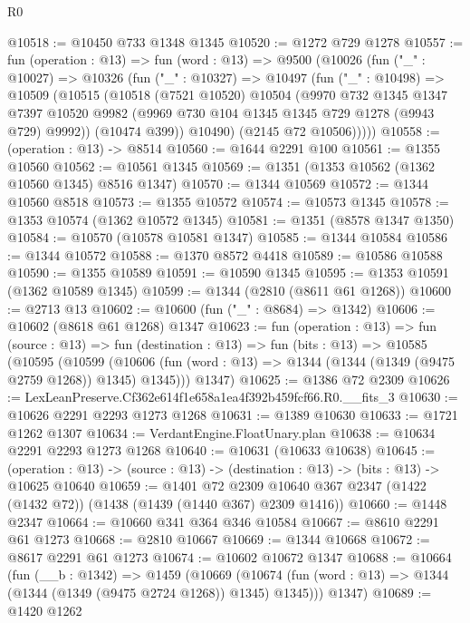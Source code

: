 \begin{lexlean}{R0}
\begin{coremodule}
@10518 := @10450 @733 @1348 @1345
@10520 := @1272 @729 @1278
@10557 := fun (operation : @13) =>
  fun (word : @13) =>
  @9500
    (@10026
      (fun ("_" : @10027) =>
      @10326
        (fun ("_" : @10327) =>
        @10497
          (fun ("_" : @10498) =>
          @10509
            (@10515
              (@10518
                (@7521 @10520)
                @10504
                (@9970
                  @732
                  @1345
                  @1347
                  @7397
                  @10520
                  @9982
                  (@9969 @730 @104 @1345 @1345 @729 @1278 (@9943 @729) @9992))
                (@10474 @399))
              @10490)
            (@2145 @72 @10506)))))
@10558 := (operation : @13) -> @8514
@10560 := @1644 @2291 @100
@10561 := @1355 @10560
@10562 := @10561 @1345
@10569 := @1351 (@1353 @10562 (@1362 @10560 @1345) @8516 @1347)
@10570 := @1344 @10569
@10572 := @1344 @10560 @8518
@10573 := @1355 @10572
@10574 := @10573 @1345
@10578 := @1353 @10574 (@1362 @10572 @1345)
@10581 := @1351 (@8578 @1347 @1350)
@10584 := @10570 (@10578 @10581 @1347)
@10585 := @1344 @10584
@10586 := @1344 @10572
@10588 := @1370 @8572 @4418
@10589 := @10586 @10588
@10590 := @1355 @10589
@10591 := @10590 @1345
@10595 := @1353 @10591 (@1362 @10589 @1345)
@10599 := @1344 (@2810 (@8611 @61 @1268))
@10600 := @2713 @13
@10602 := @10600 (fun ("_" : @8684) => @1342)
@10606 := @10602 (@8618 @61 @1268) @1347
@10623 := fun (operation : @13) =>
  fun (source : @13) =>
  fun (destination : @13) =>
  fun (bits : @13) =>
  @10585
    (@10595
      (@10599 (@10606 (fun (word : @13) => @1344 (@1344 (@1349 (@9475 @2759 @1268)) @1345) @1345)))
      @1347)
@10625 := @1386 @72 @2309
@10626 := LexLeanPreserve.Cf362e614f1e658a1ea4f392b459fcf66.R0.__fits_3
@10630 := @10626 @2291 @2293 @1273 @1268
@10631 := @1389 @10630
@10633 := @1721 @1262 @1307
@10634 := VerdantEngine.FloatUnary.plan
@10638 := @10634 @2291 @2293 @1273 @1268
@10640 := @10631 (@10633 @10638)
@10645 := (operation : @13) ->
  (source : @13) -> (destination : @13) -> (bits : @13) -> @10625 @10640
@10659 := @1401
    @72
    @2309
    @10640
    @367
    @2347
    (@1422 (@1432 @72))
    (@1438 (@1439 (@1440 @367) @2309 @1416))
@10660 := @1448 @2347
@10664 := @10660 @341 @364 @346 @10584
@10667 := @8610 @2291 @61 @1273
@10668 := @2810 @10667
@10669 := @1344 @10668
@10672 := @8617 @2291 @61 @1273
@10674 := @10602 @10672 @1347
@10688 := @10664
    (fun (__b : @1342) =>
    @1459
      (@10669 (@10674 (fun (word : @13) => @1344 (@1344 (@1349 (@9475 @2724 @1268)) @1345) @1345)))
      @1347)
@10689 := @1420 @1262

\end{coremodule}
\end{lexlean}
